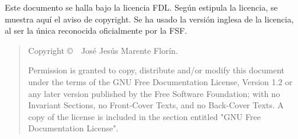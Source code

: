 \bigskip
\bigskip

Este documento se halla bajo la licencia FDL. Según estipula la
licencia, se muestra aquí el aviso de copyright. Se ha usado la
versión inglesa de la licencia, al ser la única reconocida
oficialmente por la FSF.

\begin{quote}
  Copyright \copyright~\the\year~José Jesús Marente Florín.

  Permission is granted to copy, distribute and/or modify this document
  under the terms of the GNU Free Documentation License, Version 1.2
  or any later version published by the Free Software Foundation;
  with no Invariant Sections, no Front-Cover Texts, and no Back-Cover Texts.
  A copy of the license is included in the section entitled "GNU
  Free Documentation License".
\end{quote}

